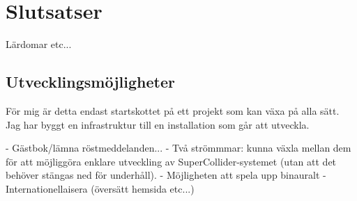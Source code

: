 \documentclass[11pt, a4paper]{article} %
\begin{document}
\section*{Slutsatser}
Lärdomar etc...

\subsection*{Utvecklingsmöjligheter}
För mig är detta endast startskottet på ett projekt som kan växa på alla sätt. Jag har byggt en infrastruktur till en installation som går att utveckla.

- Gästbok/lämna röstmeddelanden...
- Två strömmmar: kunna växla mellan dem för att möjliggöra enklare utveckling av SuperCollider-systemet (utan att det behöver stängas ned för underhåll).
- Möjligheten att spela upp binauralt
- Internationellaisera (översätt hemsida etc...)


{}
\printbibheading
\printbibliography[type=article,title={Artiklar},heading=subbibintoc]
\printbibliography[type=book,title={Böcker},heading=subbibintoc]
\printbibliography[type=online,title={Hemsidor},heading=subbibintoc]
\printbibliography[type=music,title={Musik},heading=subbibintoc]
\printbibliography[type=incollection,title={Samlingar},heading=subbibintoc]

\clearpage
\begin{appendices}
\printglossary[nonumberlist]
\end{appendices}
\end{document}
